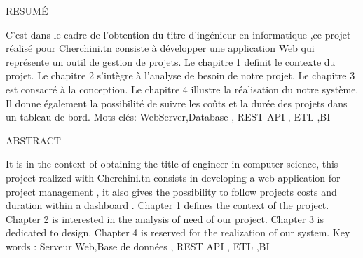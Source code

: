 \newpage
\bigskip

RESUM\'E
\bigskip
\newline

C'est dans le cadre de l'obtention du titre d'ing\'{e}nieur en informatique
,ce projet  r\'{e}alis\'{e} pour Cherchini.tn consiste \`{a} d\'{e}velopper une application Web qui repr\'{e}sente un
outil de gestion de projets.
Le chapitre 1 definit le contexte du projet. Le chapitre 2 s'int\`{e}gre \`{a} l'analyse de besoin
de notre projet. Le chapitre 3 est consacr\'{e} \`{a} la conception. Le chapitre 4 illustre la
r\'{e}alisation du notre syst\`{e}me.
Il donne également la possibilité de suivre les coûts et la durée des projets dans un tableau de bord.
\newline
\bigskip
Mots cl\'{e}s: WebServer,Database , REST API , ETL ,BI


\bigskip
\bigskip
\bigskip
\bigskip


ABSTRACT
\bigskip
\newline

It is in the context of obtaining the title of engineer in computer science, this project
realized with Cherchini.tn consists in developing a web application  for project management ,
it also gives the possibility to follow projects costs and duration within a dashboard .
Chapter 1 defines the context of the project. Chapter 2 is interested in the analysis of
need of our project. Chapter 3 is dedicated to design. Chapter 4 is reserved for the
realization of our system.
\newline
\bigskip
Key words : Serveur Web,Base de donn\'{e}es , REST API , ETL ,BI 